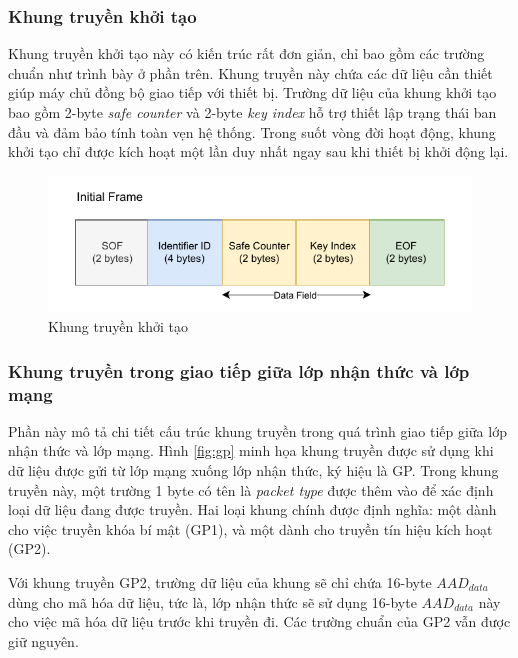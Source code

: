 \subsubsection{Khung truyền khởi tạo}
Khung truyền khởi tạo này có kiến trúc rất đơn giản, chỉ bao gồm các trường chuẩn như trình bày ở phần trên. Khung truyền này chứa các dữ liệu cần thiết giúp máy chủ đồng bộ giao tiếp với thiết bị. Trường dữ liệu của khung khởi tạo bao gồm 2-byte \textit{safe counter} và 2-byte \textit{key index} hỗ trợ thiết lập trạng thái ban đầu và đảm bảo tính toàn vẹn hệ thống. Trong suốt vòng đời hoạt động, khung khởi tạo chỉ được kích hoạt một lần duy nhất ngay sau khi thiết bị khởi động lại.
\begin{figure}[H]
    \centering
    \includegraphics[width=0.6\linewidth]{init-frame.pdf}
    \caption{Khung truyền khởi tạo}
    \label{fig:init-frame}
\end{figure}
\subsubsection{Khung truyền trong giao tiếp giữa lớp nhận thức và lớp mạng}
Phần này mô tả chi tiết cấu trúc khung truyền trong quá trình giao tiếp giữa lớp nhận thức và lớp mạng. Hình \ref{fig:gp} minh họa khung truyền được sử dụng khi dữ liệu được gửi từ lớp mạng xuống lớp nhận thức, ký hiệu là GP. Trong khung truyền này, một trường 1 byte có tên là \textit{packet type} được thêm vào để xác định loại dữ liệu đang được truyền. Hai loại khung chính được định nghĩa: một dành cho việc truyền khóa bí mật (GP1), và một dành cho truyền tín hiệu kích hoạt (GP2). 

Với khung truyền GP2, trường dữ liệu của khung sẽ chỉ chứa 16-byte $AAD_{data}$ dùng cho mã hóa dữ liệu, tức là, lớp nhận thức sẽ sử dụng 16-byte $AAD_{data}$ này cho việc mã hóa dữ liệu trước khi truyền đi. Các trường chuẩn của GP2 vẫn được giữ nguyên.

